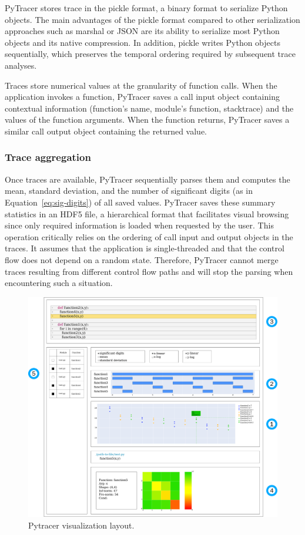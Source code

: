 \documentclass[10pt,journal,compsoc]{IEEEtran}
\newcommand{\pytracer}[0]{PyTracer\xspace}
\DeclareRobustCommand{\add}[1]{\textcolor{ao(english)}{#1}}%
\DeclareRobustCommand{\add}[1]{#1}
\begin{document}
\pytracer stores trace in the pickle format, a binary format to serialize
Python objects. The main advantages of the pickle format compared to other
serialization approaches such as marshal or JSON are its ability to serialize
most Python objects and its native compression.  In addition, pickle writes
Python objects sequentially, which preserves the temporal ordering required by
subsequent trace analyses.

Traces store numerical values at the granularity of function calls. When the
application invokes a function, \pytracer saves a call input object containing
contextual information (function's name, module's function, stacktrace) and the
values of the function arguments. When the function returns, \pytracer saves a
similar call output object containing the returned value. 


\subsubsection{Trace aggregation}

Once traces are available, \pytracer sequentially parses them and computes the
mean, standard deviation, and the number of significant digits (as in
Equation~\ref{eq:sig-digits}) of all saved values. \pytracer saves these summary
statistics in an HDF5 file, a hierarchical format that facilitates visual
browsing since only required information is loaded when requested by the user.
This operation critically relies on the ordering of call input and output
objects in the traces. It assumes that the application is
single-threaded and that the control flow does not depend on a random state.
\add{Therefore, \mbox{\pytracer} cannot merge traces resulting from different
    control flow paths and will stop the parsing when encountering such a situation.}

\begin{figure}
    \centering
    \includegraphics[width=0.75\linewidth]{figure/pytracer_layout.pdf}
    \caption{Pytracer visualization layout.}
    \label{fig:visu-layout}
\end{figure}
\end{document}
